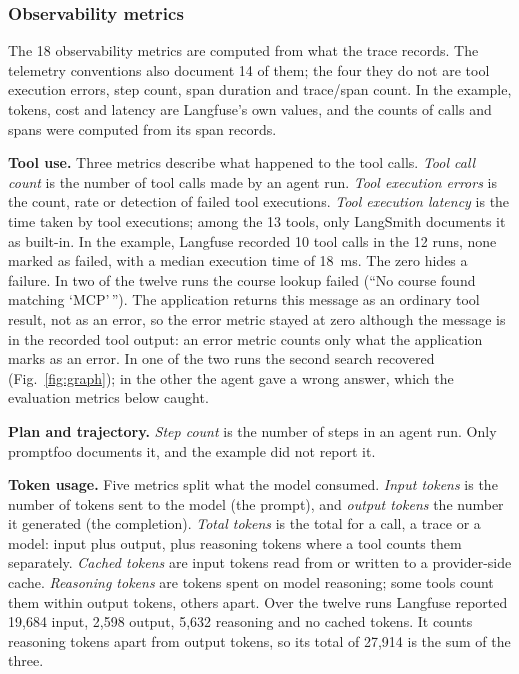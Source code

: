 \documentclass[conference]{IEEEtran}
\begin{document}
\begin{table}[!t]
\caption{What the example produced: measurements reported by Langfuse (tracing) and scores given by the Arize Phoenix and DeepEval evaluators over the 12 runs. Each row is a unique metric of the catalogue; $n$ is the number of turns scored. A dash means the tool reported nothing in this run, not that it lacks the metric: not every built-in evaluator was run. The LLM judge was \texttt{gpt-5-mini}, not validated against human labels. Generated by the authors' script from the tools' output.}
\label{tab:example}
\centering
\footnotesize
\setlength{\tabcolsep}{4pt}

\end{table}

\subsubsection{Observability metrics}
The 18 observability metrics are computed from what the trace records. The telemetry conventions also document 14 of them; the four they do not are tool execution errors, step count, span duration and trace/span count. In the example, tokens, cost and latency are Langfuse's own values, and the counts of calls and spans were computed from its span records.

\textbf{Tool use.} Three metrics describe what happened to the tool calls. \emph{Tool call count} is the number of tool calls made by an agent run. \emph{Tool execution errors} is the count, rate or detection of failed tool executions. \emph{Tool execution latency} is the time taken by tool executions; among the 13 tools, only LangSmith documents it as built-in. In the example, Langfuse recorded 10 tool calls in the 12 runs, none marked as failed, with a median execution time of 18~ms. The zero hides a failure. In two of the twelve runs the course lookup failed (``No course found matching `MCP'\,''). The application returns this message as an ordinary tool result, not as an error, so the error metric stayed at zero although the message is in the recorded tool output: an error metric counts only what the application marks as an error. In one of the two runs the second search recovered (Fig.~\ref{fig:graph}); in the other the agent gave a wrong answer, which the evaluation metrics below caught.

\textbf{Plan and trajectory.} \emph{Step count} is the number of steps in an agent run. Only promptfoo documents it, and the example did not report it.

\textbf{Token usage.} Five metrics split what the model consumed. \emph{Input tokens} is the number of tokens sent to the model (the prompt), and \emph{output tokens} the number it generated (the completion). \emph{Total tokens} is the total for a call, a trace or a model: input plus output, plus reasoning tokens where a tool counts them separately. \emph{Cached tokens} are input tokens read from or written to a provider-side cache. \emph{Reasoning tokens} are tokens spent on model reasoning; some tools count them within output tokens, others apart. Over the twelve runs Langfuse reported 19,684 input, 2,598 output, 5,632 reasoning and no cached tokens. It counts reasoning tokens apart from output tokens, so its total of 27,914 is the sum of the three.
\end{document}
